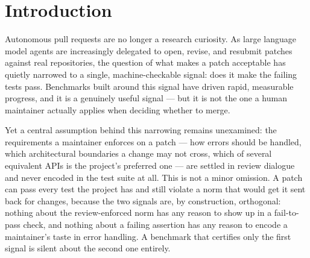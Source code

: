 \documentclass[11pt]{article}
\begin{document}
\section{Introduction}

Autonomous pull requests are no longer a research curiosity. As large language model agents are increasingly delegated to open, revise, and resubmit patches against real repositories, the question of what makes a patch acceptable has quietly narrowed to a single, machine-checkable signal: does it make the failing tests pass. Benchmarks built around this signal have driven rapid, measurable progress, and it is a genuinely useful signal --- but it is not the one a human maintainer actually applies when deciding whether to merge.

Yet a central assumption behind this narrowing remains unexamined: the requirements a maintainer enforces on a patch --- how errors should be handled, which architectural boundaries a change may not cross, which of several equivalent APIs is the project's preferred one --- are settled in review dialogue and never encoded in the test suite at all. This is not a minor omission. A patch can pass every test the project has and still violate a norm that would get it sent back for changes, because the two signals are, by construction, orthogonal: nothing about the review-enforced norm has any reason to show up in a fail-to-pass check, and nothing about a failing assertion has any reason to encode a maintainer's taste in error handling. A benchmark that certifies only the first signal is silent about the second one entirely.
\end{document}
